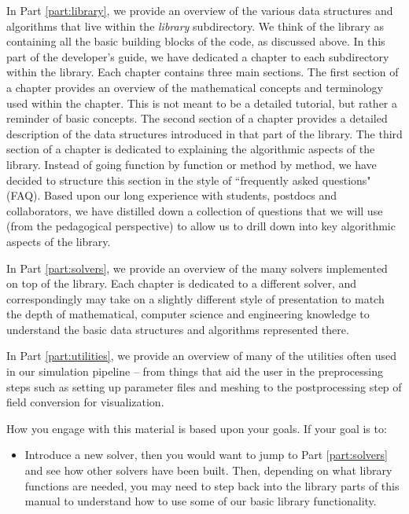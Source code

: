 In Part \ref{part:library}, we provide an overview of the various data structures and algorithms that live within the {\em library} subdirectory.  We think of the library as containing all the basic building blocks of the {\nek} code, as discussed above.  In this part of the developer's guide, we have dedicated a chapter to each subdirectory within the library.  Each chapter contains three main sections.  The first section of a chapter provides an overview of the mathematical concepts and terminology used within the chapter.  This is not meant to be a detailed tutorial, but rather a reminder of basic concepts.  The second section of a chapter provides a detailed description of the data structures introduced in that part of the library.  The third section of a chapter is dedicated to explaining the algorithmic aspects of the library.  Instead of going function by function or method by method, we have decided to structure this section in the style of ``frequently asked questions" (FAQ).  Based upon our long experience with students, postdocs and collaborators, we have distilled down a collection of questions that we will use (from the pedagogical perspective) to allow us to drill down into key algorithmic aspects of the library.

In Part \ref{part:solvers}, we provide an overview of the many solvers implemented on top of the {\nek} library.  Each chapter is dedicated to a different solver, and correspondingly may take on a slightly different style of presentation to match the depth of mathematical, computer science and engineering knowledge to understand the basic data structures and algorithms represented there.

In Part \ref{part:utilities}, we provide an overview of many of the utilities often used in our simulation pipeline -- from things that aid the user in the preprocessing steps such as setting up parameter files and meshing to the postprocessing step of field conversion for visualization.

How you engage with this material is based upon your goals.  If your goal is to:

\begin{itemize}
\item Introduce a new solver, then you would want to jump to Part \ref{part:solvers} and see how other solvers have been built.  Then, depending on what library functions are needed, you may need to step back into the library parts of this manual to understand how to use some of our basic library functionality.
\end{itemize} 







